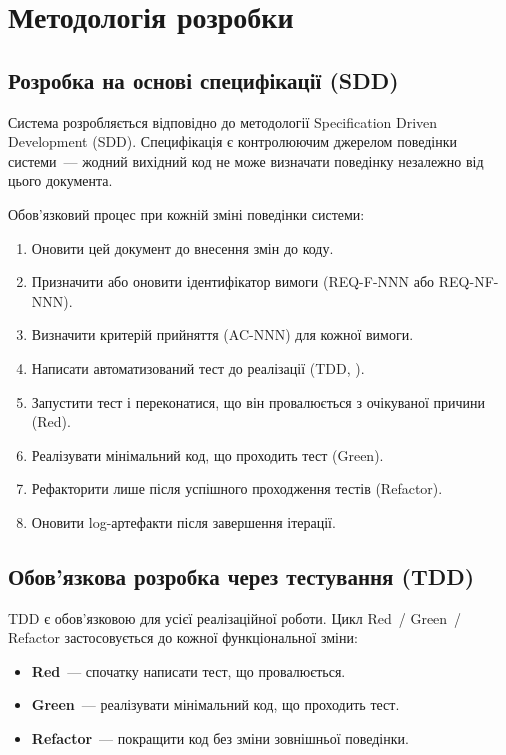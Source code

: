 \section{Методологія розробки}
\label{sec:metodolohiia}

\subsection{Розробка на основі специфікації (SDD)}

Система розробляється відповідно до методології Specification Driven Development (SDD). Специфікація є контролюючим джерелом поведінки системи~--- жодний вихідний код не може визначати поведінку незалежно від цього документа. 

Обов'язковий процес при кожній зміні поведінки системи:

\begin{enumerate}
  \item Оновити цей документ до внесення змін до коду.
  \item Призначити або оновити ідентифікатор вимоги (REQ-F-NNN або REQ-NF-NNN).
  \item Визначити критерій прийняття (AC-NNN) для кожної вимоги.
  \item Написати автоматизований тест до реалізації (TDD, ).
  \item Запустити тест і переконатися, що він провалюється з очікуваної причини (Red).
  \item Реалізувати мінімальний код, що проходить тест (Green).
  \item Рефакторити лише після успішного проходження тестів (Refactor).
  \item Оновити log-артефакти після завершення ітерації.
\end{enumerate}

\subsection{Обов'язкова розробка через тестування (TDD)}

TDD є обов'язковою для усієї реалізаційної роботи. Цикл Red~/ Green~/ Refactor застосовується до кожної функціональної зміни: 

\begin{itemize}
  \item \textbf{Red}~--- спочатку написати тест, що провалюється.
  \item \textbf{Green}~--- реалізувати мінімальний код, що проходить тест.
  \item \textbf{Refactor}~--- покращити код без зміни зовнішньої поведінки.
\end{itemize}

